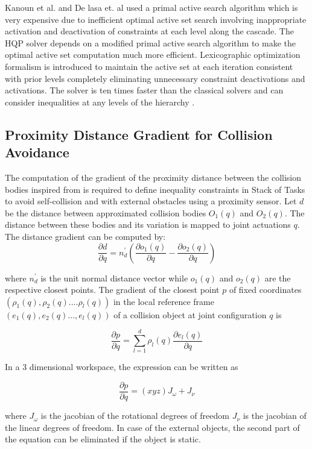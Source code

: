 Kanoun et al. and De lasa et. al used a primal active search algorithm which is very expensive due to inefficient optimal active set search involving inappropriate activation and deactivation of constraints at each level along the cascade\cite{de2010feature}\cite{kanoun2011kinematic}. The HQP solver depends on a modified primal active search algorithm to make the optimal active set computation much more efficient. Lexicographic optimization formalism is introduced to maintain the active set at each iteration consistent with prior levels completely eliminating unnecessary constraint deactivations and activations. The solver is ten times faster than the classical solvers and can consider inequalities at any levels of the
hierarchy \cite{escande2014hierarchical}.
\subsection{Proximity Distance Gradient for Collision Avoidance}
The computation of the gradient of the proximity distance between the collision bodies inspired from \cite{escandestrictly} is required to define inequality constraints in Stack of Tasks to avoid self-collision and with external obstacles using a proximity sensor. Let $d$ be the distance between approximated collision bodies $O_1(q)$ and $O_2(q)$. The distance between these bodies and its variation is mapped to joint actuations $q$. The distance gradient can be computed by:
\[ \frac{\partial d}{\partial q} = n_d^{'}(\frac{\partial o_1(q)}{\partial q}- \frac{\partial o_2(q)}{\partial q}) \]

where $n_d^{'}$ is the unit normal distance vector while $o_1(q)$ and $o_2(q)$ are the respective closest points. The gradient of the closest point $p$ of fixed coordinates $(\rho_1(q),\rho_2(q)....\rho_l(q))$ in the local reference frame $(e_1(q),e_2(q)...,e_l(q))$ of a collision object at joint configuration $q$ is

\[\frac{\partial p}{\partial q} =  \sum_{l=1}^{d}\rho_l(q)\frac{\partial e_l(q) }{\partial q}\]

In a 3 dimensional workspace, the expression can be written as 

\[ \frac{\partial p}{\partial q} =  (x y  z)J_\omega + J_\nu \]

where $J_\omega$ is the jacobian of the rotational degrees of freedom $J_\nu$ is the jacobian of the linear degrees of freedom. In case of the external objects, the second part of the equation can be eliminated if the object is static. 

